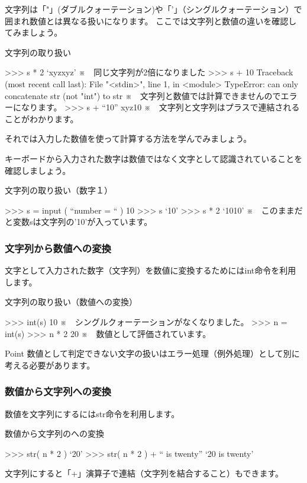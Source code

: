 \documentclass[11pt,a4paper,dvipdfmx,titlepage]{jsreport}
\begin{document}
文字列は「"」(ダブルクォーテーション)や「'」（シングルクォーテーション）で囲まれ数値とは異なる扱いになります。
ここでは文字列と数値の違いを確認してみましょう。
\begin{grabox}{文字列の取り扱い}
\begin{listingcont}
>>> s * 2
‘xyzxyz’
※　同じ文字列が2倍になりました
>>> s + 10
Traceback (most recent call last):
  File "<stdin>", line 1, in <module>
TypeError: can only concatenate str (not "int") to str
※　文字列と数値では計算できませんのでエラーになります。
>>> s + “10”
xyz10
※　文字列と文字列はプラスで連結されることがわかります。
\end{listingcont}
\end{grabox}

それでは入力した数値を使って計算する方法を学んでみましょう。

キーボードから入力された数字は数値ではなく文字として認識されていることを確認しましょう。

\begin{grabox}{文字列の取り扱い（数字１）}
\begin{listingcont}
>>> s = input ( “number = “ )
10
>>> s
‘10’
>>> s * 2
‘1010’
※　このままだと変数sは文字列の’10’が入っています。
\end{listingcont}
\end{grabox}
\subsubsection{文字列から数値への変換}
文字として入力された数字（文字列）を数値に変換するためにはint命令を利用します。
\begin{grabox}{文字列の取り扱い（数値への変換）}
\begin{listingcont}
>>> int(s)
10
※　シングルクォーテーションがなくなりました。
>>> n = int(s)
>>> n * 2
20
※　数値として評価されています。
\end{listingcont}
\end{grabox}
\begin{hipoint}{Point}
数値として判定できない文字の扱いはエラー処理（例外処理）として別に考える必要があります。
\end{hipoint}
\subsubsection{数値から文字列への変換}
数値を文字列にするにはstr命令を利用します。
\begin{grabox}{数値から文字列のへの変換}
\begin{listingcont}
>>> str( n * 2 )
‘20’
>>> str( n * 2 ) + “ is twenty”
‘20 is twenty’
\end{listingcont}
\end{grabox}
文字列にすると「+」演算子で連結（文字列を結合すること）もできます。
\end{document}
